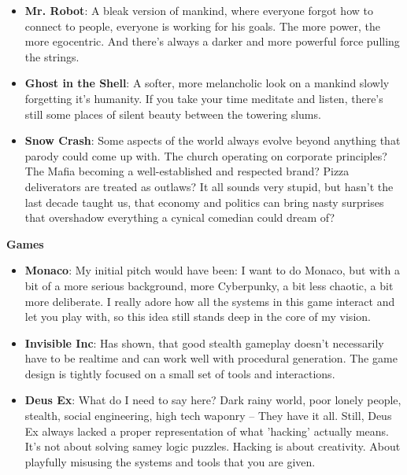 \documentclass[11pt,a4paper]{article}
\begin{document}
\begin{itemize}
    \item \textbf{Mr. Robot}: A bleak version of mankind, where everyone forgot how to connect to people,
            everyone is working for his goals. The more power, the more egocentric. And there's
            always a darker and more powerful force pulling the strings.
    \item \textbf{Ghost in the Shell}: A softer, more melancholic look on a mankind slowly forgetting it's
            humanity. If you take your time meditate and listen, there's still some places of silent
            beauty between the towering slums.
    \item \textbf{Snow Crash}: Some aspects of the world always evolve beyond anything that parody could come
            up with. The church operating on corporate principles? The Mafia becoming a
            well-established and respected brand? Pizza deliverators are treated as outlaws?
            It all sounds very stupid, but hasn't the last decade taught us, that economy and politics
            can bring nasty surprises that overshadow everything a cynical comedian could dream of?
\end{itemize}

\textbf{Games}

\begin{itemize}
    \item \textbf{Monaco}: My initial pitch would have been: I want to do Monaco, but with a bit of a more serious
                background, more Cyberpunky, a bit less chaotic, a bit more deliberate. I really adore how all
                the systems in this game interact and let you play with, so this idea still stands deep in the
                core of my vision.
    \item \textbf{Invisible Inc}: Has shown, that good stealth gameplay doesn't necessarily have to be realtime
                and can work well with procedural generation. The game design is tightly focused on a small set
                of tools and interactions.
    \item \textbf{Deus Ex}: What do I need to say here? Dark rainy world, poor lonely people, stealth,
                social engineering, high tech waponry -- They have it all. Still, Deus Ex always lacked a proper representation of
                what 'hacking' actually means. It's not about solving samey logic puzzles. Hacking is about creativity.
                About playfully misusing the systems and tools that you are given.
\end{itemize}
\end{document}
